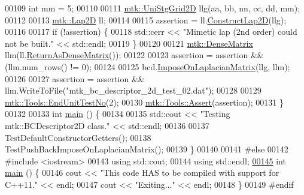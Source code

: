 \begin{DoxyCode}
00109   \textcolor{keywordtype}{int} mm = 5;
00110 
00111   \hyperlink{classmtk_1_1UniStgGrid2D}{mtk::UniStgGrid2D} llg(aa, bb, nn, cc, dd, mm);
00112 
00113   \hyperlink{classmtk_1_1Lap2D}{mtk::Lap2D} ll;
00114 
00115   assertion = ll.\hyperlink{classmtk_1_1Lap2D_a188ee8fee643463affca7de2884711b1}{ConstructLap2D}(llg);
00116 
00117   \textcolor{keywordflow}{if} (!assertion) \{
00118     std::cerr << \textcolor{stringliteral}{"Mimetic lap (2nd order) could not be built."} << std::endl;
00119   \}
00120 
00121   \hyperlink{classmtk_1_1DenseMatrix}{mtk::DenseMatrix} llm(ll.\hyperlink{classmtk_1_1Lap2D_aaac0a22eaa2f036869b24fd420ce5761}{ReturnAsDenseMatrix}());
00122 
00123   assertion = assertion && (llm.num\_rows() != 0);
00124 
00125   bcd.\hyperlink{classmtk_1_1BCDescriptor2D_a35592617dda3b965b680b2a1355122f4}{ImposeOnLaplacianMatrix}(llg, llm);
00126 
00127   assertion = assertion && llm.WriteToFile(\textcolor{stringliteral}{"mtk\_bc\_descriptor\_2d\_test\_02.dat"});
00128 
00129   \hyperlink{classmtk_1_1Tools_aba67d9dc35c9c1c49430fcc9ea035e03}{mtk::Tools::EndUnitTestNo}(2);
00130   \hyperlink{classmtk_1_1Tools_ac6804df469c94ab6a796fb64f1e44a89}{mtk::Tools::Assert}(assertion);
00131 \}
00132 
00133 \textcolor{keywordtype}{int} \hyperlink{mtk__bc__descriptor__2d__test_8cc_ae66f6b31b5ad750f1fe042a706a4e3d4}{main} () \{
00134 
00135   std::cout << \textcolor{stringliteral}{"Testing mtk::BCDescriptor2D class."} << std::endl;
00136 
00137   TestDefaultConstructorGetters();
00138   TestPushBackImposeOnLaplacianMatrix();
00139 \}
00140 
00141 \textcolor{preprocessor}{#else}
00142 \textcolor{preprocessor}{#include <iostream>}
00143 \textcolor{keyword}{using} std::cout;
00144 \textcolor{keyword}{using} std::endl;
\hypertarget{mtk__bc__descriptor__2d__test_8cc_source_l00145}{}\hyperlink{mtk__bc__descriptor__2d__test_8cc_ae66f6b31b5ad750f1fe042a706a4e3d4}{00145} \textcolor{keywordtype}{int} \hyperlink{mtk__bc__descriptor__2d__test_8cc_ae66f6b31b5ad750f1fe042a706a4e3d4}{main} () \{
00146   cout << \textcolor{stringliteral}{"This code HAS to be compiled with support for C++11."} << endl;
00147   cout << \textcolor{stringliteral}{"Exiting..."} << endl;
00148 \}
00149 \textcolor{preprocessor}{#endif}
\end{DoxyCode}
